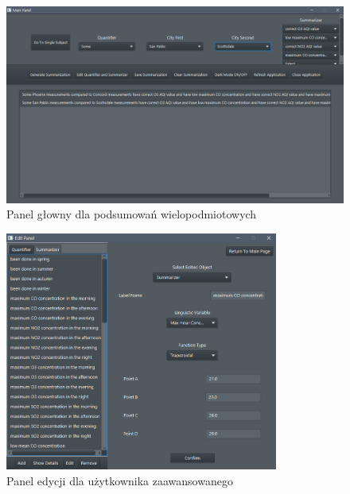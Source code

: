 \documentclass{classrep}
\begin{document}
{{            \begin{figure}[!htbp]
            \centering
            \includegraphics[width=1\textwidth]{img/gui/multi_main.png}
            \caption{Panel głowny dla podsumowań wielopodmiotowych}
            \end{figure}
            \FloatBarrier

            \begin{figure}[!htbp]
            \centering
            \includegraphics[width=0.8\textwidth]{img/gui/editor.png}
            \caption{Panel edycji dla użytkownika zaawansowanego}
            \end{figure}
            \FloatBarrier
        }

}
\end{document}

